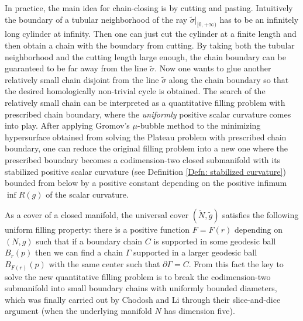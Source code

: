 \documentclass[11pt,letterpaper]{amsart}
\numberwithin{equation}{section}
\theoremstyle{definition}
\begin{document}
In practice, the main idea for chain-closing is by cutting and pasting. Intuitively the boundary of a tubular neighborhood of the ray $\tilde\sigma|_{[0,+\infty)}$ has to be an infinitely long cylinder at infinity. Then one can just cut the cylinder at a finite length and then obtain a chain with the boundary from cutting. By taking both the tubular neighborhood and the cutting length large enough, the chain boundary can be guaranteed to be far away from the line $\tilde\sigma$. Now one wants to glue another relatively small chain disjoint from the line $\tilde\sigma$ along the chain boundary so that the desired homologically non-trivial cycle is obtained. The search of the relatively small chain can be interpreted as a quantitative filling problem with prescribed chain boundary, where the \emph{uniformly} positive scalar curvature comes into play.
After applying Gromov's $\mu$-bubble method to the minimizing hypersurface obtained from solving the Plateau problem with prescribed chain boundary, one can reduce the original filling problem into a new one where the prescribed boundary becomes a codimension-two closed submanifold with its stabilized positive scalar curvature (see Definition \ref{Defn: stabilized curvature}) bounded from below by a positive constant depending on the positive infimum $\inf R(g)$ of the scalar curvature.

As a cover of a closed manifold, the universal cover $(\tilde N,\tilde g)$ satisfies the following uniform filling property: there is a positive function $F=F(r)$ depending on $(N,g)$ such that if a boundary chain $C$ is supported in some geodesic ball $B_r(p)$ then we can find a chain $\Gamma$ supported in a larger geodesic ball $B_{F(r)}(p)$ with the same center such that $\partial\Gamma=C$. From this fact the key to solve the new quantitative filling problem is to break the codimension-two submanifold into small boundary chains with uniformly bounded diameters, which was finally carried out by Chodosh and Li through their slice-and-dice argument (when the underlying manifold $N$ has dimension five).
\end{document}

